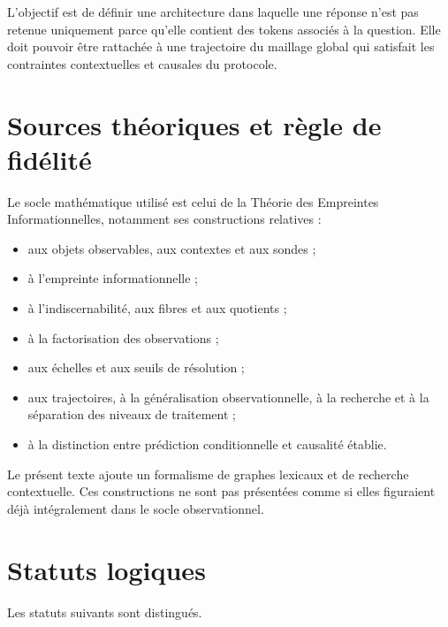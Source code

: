 \documentclass[11pt,a4paper,oneside]{book}
\theoremstyle{remark}
\begin{document}
L'objectif est de définir une architecture dans laquelle une réponse
n'est pas retenue uniquement parce qu'elle contient des tokens
associés à la question. Elle doit pouvoir être rattachée à une
trajectoire du maillage global qui satisfait les contraintes
contextuelles et causales du protocole.

\section{Sources théoriques et règle de fidélité}

Le socle mathématique utilisé est celui de la Théorie des Empreintes
Informationnelles, notamment ses constructions relatives :

\begin{itemize}
  \item aux objets observables, aux contextes et aux sondes ;
  \item à l'empreinte informationnelle ;
  \item à l'indiscernabilité, aux fibres et aux quotients ;
  \item à la factorisation des observations ;
  \item aux échelles et aux seuils de résolution ;
  \item aux trajectoires, à la généralisation observationnelle,
        à la recherche et à la séparation des niveaux de traitement ;
  \item à la distinction entre prédiction conditionnelle et causalité
        établie.
\end{itemize}

Le présent texte ajoute un formalisme de graphes lexicaux et de
recherche contextuelle. Ces constructions ne sont pas présentées
comme si elles figuraient déjà intégralement dans le socle
observationnel.

\section{Statuts logiques}

Les statuts suivants sont distingués.
\end{document}
